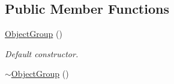\subsection*{Public Member Functions}
\begin{DoxyCompactItemize}
\item 
\hypertarget{class_object_group_af4d309432161dab231e33e83acaf4161}{\hyperlink{class_object_group_af4d309432161dab231e33e83acaf4161}{Object\-Group} ()}\label{class_object_group_af4d309432161dab231e33e83acaf4161}

\begin{DoxyCompactList}\small\item\em Default constructor. \end{DoxyCompactList}\item 
\hypertarget{class_object_group_a58c2e7cf18338d3fbe47f30fafca3c77}{\hyperlink{class_object_group_a58c2e7cf18338d3fbe47f30fafca3c77}{$\sim$\-Object\-Group} ()}\label{class_object_group_a58c2e7cf18338d3fbe47f30fafca3c77}


\end{DoxyCompactItemize}
